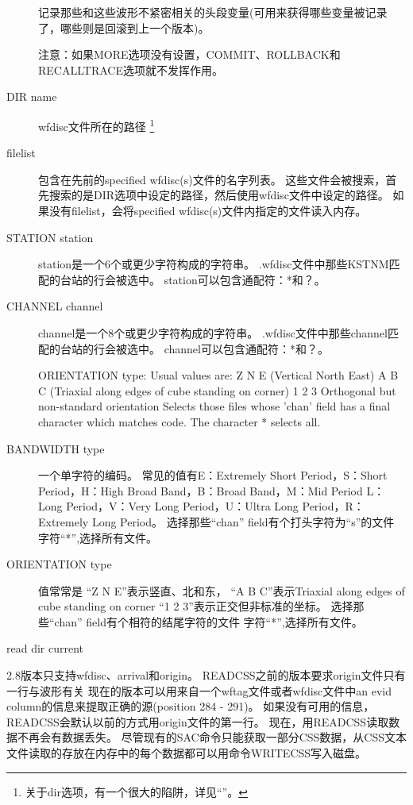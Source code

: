 \begin{description}
    记录那些和这些波形不紧密相关的头段变量(可用来获得哪些变量被记录了，哪些则是回滚到上一个版本)。%

    注意：如果MORE选项没有设置，COMMIT、ROLLBACK和RECALLTRACE选项就不发挥作用。%
\item [DIR name] wfdisc文件所在的路径
    \footnote{关于dir选项，有一个很大的陷阱，详见``''。}
\item [filelist] 包含在先前的specified wfdisc(s)文件的名字列表。%
    这些文件会被搜索，首先搜索的是DIR选项中设定的路径，然后使用wfdisc文件中设定的路径。
    如果没有filelist，会将specified wfdisc(s)文件内指定的文件读入内存。
\item[STATION station]station是一个6个或更少字符构成的字符串。
    .wfdisc文件中那些KSTNM匹配的台站的行会被选中。
    station可以包含通配符：*和？。
\item[CHANNEL channel]channel是一个8个或更少字符构成的字符串。
    .wfdisc文件中那些channel匹配的台站的行会被选中。
    channel可以包含通配符：*和？。


ORIENTATION type: Usual values are: Z N E (Vertical North East) A B C (Triaxial along
edges of cube standing on corner) 1 2 3 Orthogonal but non-standard orientation
Selects those files whose ’chan’ field has a final character which matches code. The
character * selects all.
\item [BANDWIDTH type] 一个单字符的编码。
    常见的值有E：Extremely Short Period，S：Short Period，H：High Broad Band，B：Broad Band，M：Mid Period
    L：Long Period，V：Very Long Period，U：Ultra Long Period，R：Extremely Long Period。
    选择那些``chan'' field有个打头字符为``s''的文件%
    字符``*'',选择所有文件。
\item [ORIENTATION type]值常常是
    ``Z N E''表示竖直、北和东，
    ``A B C''表示Triaxial along edges of cube standing on corner%
    ``1 2 3''表示正交但非标准的坐标。
    选择那些``chan'' field有个相符的结尾字符的文件%
    字符``*'',选择所有文件。
\end{description}


\begin{SACDFT}
read dir current
\end{SACDFT}

2.8版本只支持wfdisc、arrival和origin。
READCSS之前的版本要求origin文件只有一行与波形有关%
现在的版本可以用来自一个wftag文件或者wfdisc文件中an evid column的信息来提取正确的源(position 284 - 291)。%
如果没有可用的信息，READCSS会默认以前的方式用origin文件的第一行。
现在，用READCSS读取数据不再会有数据丢失。
尽管现有的SAC命令只能获取一部分CSS数据，从CSS文本文件读取的存放在内存中的每个数据都可以用命令WRITECSS写入磁盘。

